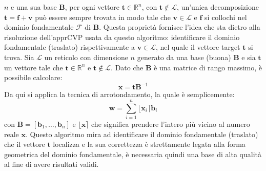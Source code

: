 $n$ e una sua base $\mathbf{B}$, per ogni vettore $\mathbf{t} \in \mathbb{R}^n$,
con $\mathbf{t} \notin \mathcal{L}$, un'unica decomposizione $\mathbf{t} = \mathbf{f} + \mathbf{v}$
può essere sempre trovata in modo tale che $\mathbf{v} \in \mathcal{L}$ e $\mathbf{f}$ si collochi
nel dominio fondamentale $\mathcal{F}$ di $\mathbf{B}$. Questa proprietà fornisce l'idea
che sta dietro alla risoluzione dell'apprCVP usata da questo algoritmo: identificare il dominio fondamentale (traslato) rispettivamente
a $\mathbf{v} \in \mathcal{L}$, nel quale il vettore target $\mathbf{t}$ si trova. 
Sia $\mathcal{L}$ un reticolo con 
dimensione $n$ generato da una base (buona) $\mathbf{B}$ e sia $\mathbf{t}$ un vettore tale che
$\mathbf{t} \in \mathbb{R}^n$ e $\mathbf{t} \notin \mathcal{L}$. Dato che $\mathbf{B}$ è una
matrice di rango massimo, è possibile calcolare:
\[
    \mathbf{x} = \mathbf{t}\mathbf{B}^{-1}
\]
Da qui si applica la tecnica di arrotondamento, la quale è semplicemente:
\[
    \mathbf{w} = \sum_{i=1}^{n} \lfloor \mathbf{x}_i \rceil  \mathbf{b}_i
\]
con $\mathbf{B} = [\mathbf{b}_1,\dots,\mathbf{b}_n]$ e $\lfloor\mathbf{x}\rceil$ che significa
prendere l'intero più vicino al numero reale $\mathbf{x}$. Questo algoritmo mira ad 
identificare il dominio fondamentale (traslato) che il vettore $\mathbf{t}$ localizza e la sua
correttezza è strettamente legata alla forma geometrica del dominio fondamentale, è necessaria
quindi una base di alta qualità al fine di avere risultati validi. 

